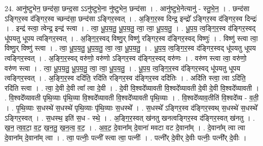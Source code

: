 \documentclass[17pt]{extarticle}
\begin{document}
24. आनु॑ष्टुभेन॒ छन्द॑सा॒ छन्द॒सा ऽऽनु॑ष्टुभे॒ना नु॑ष्टुभेन॒ छन्द॑सा । . आनु॑ष्टुभे॒नेत्यानु॑ - स्तु॒भे॒न॒ । . छन्द॑सा ऽङ्गिर॒स्व द॑ङ्गिर॒स्व च्छन्द॑सा॒ छन्द॑सा ऽङ्गिर॒स्वत् । . अ॒ङ्गि॒र॒स्व दिन्द्र॒ इन्द्रो᳚ ऽङ्गिर॒स्व द॑ङ्गिर॒स्व दिन्द्रः॑ । . इन्द्र॑ स्त्वा॒ त्वेन्द्र॒ इन्द्र॑ स्त्वा । . त्वा॒ धू॒प॒य॒तु॒ धू॒प॒य॒तु॒ त्वा॒ त्वा॒ धू॒प॒य॒तु॒ । . धू॒प॒य॒ त्व॒ङ्गि॒र॒स्व द॑ङ्गिर॒स्वद् धू॑पयतु धूपय त्वङ्गिर॒स्वत् । . अ॒ङ्गि॒र॒स्वद् विष्णु॒र् विष्णु॑ रङ्गिर॒स्व द॑ङ्गिर॒स्वद् विष्णुः॑ । . विष्णु॑ स्त्वा त्वा॒ विष्णु॒र् विष्णु॑ स्त्वा । . त्वा॒ धू॒प॒य॒तु॒ धू॒प॒य॒तु॒ त्वा॒ त्वा॒ धू॒प॒य॒तु॒ । . धू॒प॒य॒ त्व॒ङ्गि॒र॒स्व द॑ङ्गिर॒स्वद् धू॑पयतु धूपय त्वङ्गिर॒स्वत् । . अ॒ङ्गि॒र॒स्वद् वरु॑णो॒ वरु॑णो ऽङ्गिर॒स्व द॑ङ्गिर॒स्वद् वरु॑णः । . वरु॑ण स्त्वा त्वा॒ वरु॑णो॒ वरु॑ण स्त्वा । . त्वा॒ धू॒प॒य॒तु॒ धू॒प॒य॒तु॒ त्वा॒ त्वा॒ धू॒प॒य॒तु॒ । . धू॒प॒य॒ त्व॒ङ्गि॒र॒स्व द॑ङ्गिर॒स्वद् धू॑पयतु धूपय त्वङ्गिर॒स्वत् । . अ॒ङ्गि॒र॒स्व ददि॑ति॒ रदि॑ति रङ्गिर॒स्व द॑ङ्गिर॒स्व ददि॑तिः । . अदि॑ति स्त्वा॒ त्वा ऽदि॑ति॒ रदि॑ति स्त्वा । . त्वा॒ दे॒वी दे॒वी त्वा᳚ त्वा दे॒वी । . दे॒वी वि॒श्वदे᳚व्यावती वि॒श्वदे᳚व्यावती दे॒वी दे॒वी वि॒श्वदे᳚व्यावती । . वि॒श्वदे᳚व्यावती पृथि॒व्याः पृ॑थि॒व्या वि॒श्वदे᳚व्यावती वि॒श्वदे᳚व्यावती पृथि॒व्याः । . वि॒श्वदे᳚व्याव॒तीति॑ वि॒श्वदे᳚व्य - व॒ती॒ । . पृ॒थि॒व्याः स॒धस्थे॑ स॒धस्थे॑ पृथि॒व्याः पृ॑थि॒व्याः स॒धस्थे᳚ । . स॒धस्थे᳚ ऽङ्गिर॒स्व द॑ङ्गिर॒स्वथ् स॒धस्थे॑ स॒धस्थे᳚ ऽङ्गिर॒स्वत् । . स॒धस्थ॒ इति॑ स॒ध - स्थे॒ । . अ॒ङ्गि॒र॒स्वत् ख॑नतु खनत्वङ्गिर॒स्व द॑ङ्गिर॒स्वत् ख॑नतु । . ख॒न॒ त्व॒व॒टा॒ व॒ट॒ ख॒न॒तु॒ ख॒न॒त्व॒ व॒ट॒ । . अ॒व॒ट॒ दे॒वाना᳚म् दे॒वाना॑ मवटा वट दे॒वाना᳚म् । . दे॒वाना᳚म् त्वा त्वा दे॒वाना᳚म् दे॒वाना᳚म् त्वा । . त्वा॒ पत्नीः॒ पत्नी᳚ स्त्वा त्वा॒ पत्नीः᳚ । . पत्नी᳚र् दे॒वीर् दे॒वीः पत्नीः॒ पत्नी᳚र् दे॒वीः । \newline
\end{document}
